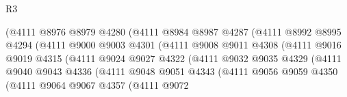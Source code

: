 \begin{lexlean}{R3}
\begin{coremodule}
                                  (@4111
                                    @8976
                                    @8979
                                    @4280
                                    (@4111
                                      @8984
                                      @8987
                                      @4287
                                      (@4111
                                        @8992
                                        @8995
                                        @4294
                                        (@4111
                                          @9000
                                          @9003
                                          @4301
                                          (@4111
                                            @9008
                                            @9011
                                            @4308
                                            (@4111
                                              @9016
                                              @9019
                                              @4315
                                              (@4111
                                                @9024
                                                @9027
                                                @4322
                                                (@4111
                                                  @9032
                                                  @9035
                                                  @4329
                                                  (@4111
                                                    @9040
                                                    @9043
                                                    @4336
                                                    (@4111
                                                      @9048
                                                      @9051
                                                      @4343
                                                      (@4111
                                                        @9056
                                                        @9059
                                                        @4350
                                                        (@4111
                                                          @9064
                                                          @9067
                                                          @4357
                                                          (@4111
                                                            @9072

\end{coremodule}
\end{lexlean}

